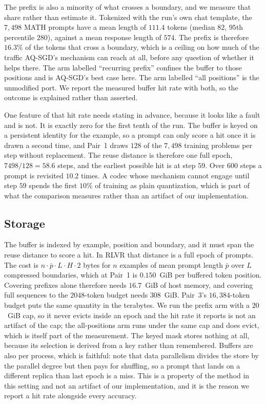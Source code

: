 \begin{revised}
The prefix is also a minority of what crosses a boundary, and we measure that
share rather than estimate it. Tokenized with the run's own chat template, the
$7{,}498$ MATH prompts have a mean length of $111.4$ tokens (median $82$, $95$th
percentile $280$), against a mean response length of $574$. The prefix is
therefore $16.3\%$ of the tokens that cross a boundary, which is a ceiling on
how much of the traffic AQ-SGD's mechanism can reach at all, before any
question of whether it helps there. The arm labelled ``recurring prefix''
confines the buffer to those positions and is AQ-SGD's best case here. The arm
labelled ``all positions'' is the unmodified port. We report the measured
buffer hit rate with both, so the outcome is explained rather than asserted.

One feature of that hit rate needs stating in advance, because it looks like a
fault and is not. It is exactly zero for the first tenth of the run. The buffer
is keyed on a persistent identity for the example, so a prompt can only score a
hit once it is drawn a second time, and Pair~1 draws $128$ of the $7{,}498$
training problems per step without replacement. The reuse distance is therefore
one full epoch, $7498/128 = 58.6$ steps, and the earliest possible hit is at
step $59$. Over $600$ steps a prompt is revisited $10.2$ times. A codec whose
mechanism cannot engage until step $59$ spends the first $10\%$ of training as
plain quantization, which is part of what the comparison measures rather than
an artifact of our implementation.

\subsection{Storage}

The buffer is indexed by example, position and boundary, and it must span the
reuse distance to score a hit. In RLVR that distance is a full epoch of
prompts. The cost is $n\cdot\bar p\cdot L\cdot H\cdot 2$ bytes for $n$ examples
of mean prompt length $\bar p$ over $L$ compressed boundaries, which at Pair~1
is $0.150$~GiB per buffered token position. Covering prefixes alone therefore
needs $16.7$~GiB of host memory, and covering full sequences to the $2048$-token
budget needs $308$~GiB. Pair~3's $16{,}384$-token budget puts the same quantity
in the terabytes. We run the prefix arm with a $20$~GiB cap, so it never evicts
inside an epoch and the hit rate it reports is not an artifact of the cap; the
all-positions arm runs under the same cap and does evict, which is itself part
of the measurement. The keyed mask stores nothing at
all, because its selection is derived from a key rather than remembered. Buffers
are also per process, which is faithful: \citet{wang2022aqsgd} note that data
parallelism divides the store by the parallel degree but then pays for
shuffling, so a prompt that lands on a different replica than last epoch is a
miss. This is a property of the method in this setting and not an artifact of
our implementation, and it is the reason we report a hit rate alongside every
accuracy.


\end{revised}
